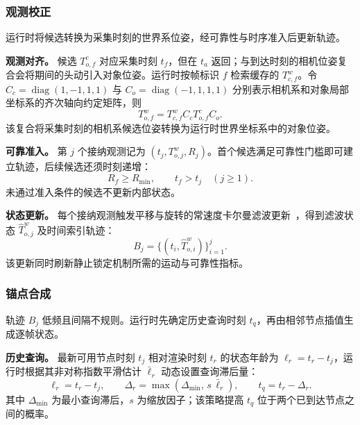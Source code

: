 \documentclass[review]{vgtc}
\begin{document}
\subsubsection{观测校正}\label{sec:obs-update}

运行时将候选转换为采集时刻的世界系位姿，经可靠性与时序准入后更新轨迹。

\textbf{观测对齐。}
候选 $T_{o,f}^{c}$ 对应采集时刻 $t_f$，但在 $t_a$ 返回；与到达时刻的相机位姿复合会将期间的头动引入对象位姿。运行时按帧标识 $f$ 检索缓存的 $T_{c,f}^{w}$。令 $C_c=\operatorname{diag}(1,-1,1,1)$ 与 $C_o=\operatorname{diag}(-1,1,1,1)$ 分别表示相机系和对象局部坐标系的齐次轴向约定矩阵，则
\begin{equation}
T_{o,f}^{w}=T_{c,f}^{w}C_cT_{o,f}^{c}C_o.
\label{eq:capture-alignment}
\end{equation}
该复合将采集时刻的相机系候选位姿转换为运行时世界坐标系中的对象位姿。

\textbf{可靠准入。}
第 $j$ 个接纳观测记为 $(t_j,T_{o,j}^{w},R_j)$。首个候选满足可靠性门槛即可建立轨迹，后续候选还须时刻递增：
\begin{equation}
R_f \geq R_{\min}, \qquad t_f > t_j \quad (j \geq 1).
\label{eq:admission}
\end{equation}
未通过准入条件的候选不更新内部状态。

\textbf{状态更新。}
每个接纳观测触发平移与旋转的常速度卡尔曼滤波更新~\cite{kalman1960new}，得到滤波状态 $\widehat{T}_{o,j}^{w}$ 及时间索引轨迹：
\begin{equation}
B_j = \{(t_i, \widehat{T}_{o,i}^{w})\}_{i=1}^{j}.
\label{eq:trajectory}
\end{equation}
该更新同时刷新静止锁定机制所需的运动与可靠性指标。

\subsubsection{锚点合成}\label{sec:frame-output}

轨迹 $B_j$ 低频且间隔不规则。运行时先确定历史查询时刻 $t_q$，再由相邻节点插值生成逐帧状态。

\textbf{历史查询。}
最新可用节点时刻 $t_j$ 相对渲染时刻 $t_r$ 的状态年龄为 $\ell_r=t_r-t_j$，运行时根据其非对称指数平滑估计 $\bar{\ell}_r$ 动态设置查询滞后量：
\begin{equation}
\ell_r = t_r - t_j, \qquad \Delta_r = \max(\Delta_{\min},\, s\,\bar{\ell}_r), \qquad t_q = t_r - \Delta_r.
\label{eq:target-time}
\end{equation}
其中 $\Delta_{\min}$ 为最小查询滞后，$s$ 为缩放因子；该策略提高 $t_q$ 位于两个已到达节点之间的概率。
\end{document}
